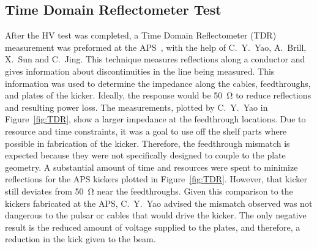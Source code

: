 \documentclass[aps,prab,preprint,groupedaddress,linenumbers]{revtex4-2}
\begin{document}
\subsection{Time Domain Reflectometer Test}
After the HV test was completed, a Time Domain Reflectometer (TDR) measurement was preformed at the APS~\cite{TDR}, 
with the help of C.~Y.~Yao, A.~Brill, X.~Sun and C.~Jing.
This technique measures reflections along a conductor and gives information about discontinuities in the line being measured. 
This information was used to determine the impedance along the cables, feedthroughs, and plates of the kicker. 
Ideally, the response would be \SI{50}{\ohm} to reduce reflections and resulting power loss. 
The measurements, plotted by C.~Y.~Yao in Figure~\ref{fig:TDR}, show a larger impedance at the feedthrough locations.
Due to resource and time constraints, it was a goal to use off the shelf parts where possible in fabrication of the kicker.
Therefore, the feedthrough mismatch is expected because they were not specifically designed to couple to the plate geometry.
A substantial amount of time and resources were spent to minimize reflections for the APS kickers plotted in Figure~\ref{fig:TDR}.
However, that kicker still deviates from \SI{50}{\ohm} near the feedthroughs.
Given this comparison to the kickers fabricated at the APS, C.~Y.~Yao advised the mismatch observed was not dangerous to 
the pulsar or cables that would drive the kicker.  
The only negative result is the reduced amount of voltage supplied to the plates, and therefore, a reduction in the kick given to the beam.
\end{document}

